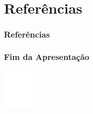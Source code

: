 \documentclass[aspectratio=169]{beamer}
\begin{document}
\section{Referências}

\begin{frame}[fragile] \frametitle{Referências}
  \printbibliography
\end{frame}

\begin{frame} \frametitle{Fim da Apresentação}
\begin{center}
 \vspace*{2em}

 \lipsum[3][20]

 \vspace*{2em}
 \includegraphics[width=1.5cm]{logoif}
\end{center}
\end{frame}
\end{document}
